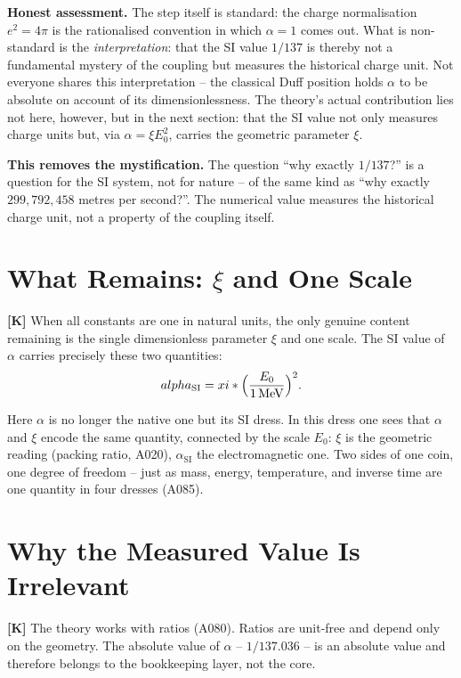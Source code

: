\textbf{Honest assessment.} The step itself is standard: the charge
normalisation $e^2 = 4\pi$ is the rationalised convention in which
$\alpha = 1$ comes out. What is non-standard is the \emph{interpretation}:
that the SI value $1/137$ is thereby not a fundamental mystery of the coupling
but measures the historical charge unit. Not everyone shares this interpretation
-- the classical Duff position holds $\alpha$ to be absolute on account of its
dimensionlessness. The theory's actual contribution lies not here, however, but in
the next section: that the SI value not only measures charge units but, via
$\alpha = \xi E_0^2$, carries the geometric parameter $\xi$.

\textbf{This removes the mystification.} The question ``why exactly $1/137$?''
is a question for the SI system, not for nature -- of the same kind as ``why
exactly $299{,}792{,}458$ metres per second?''. The numerical value measures the
historical charge unit, not a property of the coupling itself.

\section{What Remains: $\xi$ and One Scale}

\textbf{[K]} When all constants are one in natural units, the only genuine
content remaining is the single dimensionless parameter $\xi$ and one scale.
The SI value of $\alpha$ carries precisely these two quantities:
\[
  \alpha_\text{SI} = \xi\cdot\Bigl(\frac{E_0}{1\,\text{MeV}}\Bigr)^2 .
\]

Here $\alpha$ is no longer the native one but its SI dress. In this dress one
sees that $\alpha$ and $\xi$ encode the same quantity, connected by the scale
$E_0$: $\xi$ is the geometric reading (packing ratio, A020), $\alpha_\text{SI}$
the electromagnetic one. Two sides of one coin, one degree of freedom -- just as
mass, energy, temperature, and inverse time are one quantity in four dresses (A085).

\section{Why the Measured Value Is Irrelevant}

\textbf{[K]} The theory works with ratios (A080). Ratios are unit-free and depend
only on the geometry. The absolute value of $\alpha$ -- $1/137{.}036$ -- is an
absolute value and therefore belongs to the bookkeeping layer, not the core.

